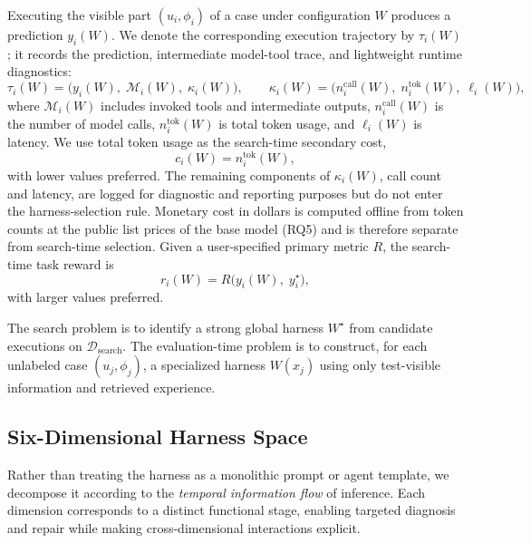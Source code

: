 \documentclass{article}
\begin{document}
\noindent
Executing the visible part $(u_i,\phi_i)$ of a case under configuration $W$
produces a prediction $y_i(W)$. We denote the corresponding execution
trajectory by $\tau_i(W)$; it records the prediction, intermediate
model-tool trace, and lightweight runtime diagnostics:
\begin{equation}
\label{eq:trajectory}
\tau_i(W)
=
\bigl(
  y_i(W),\;
  \mathcal{M}_i(W),\;
  \kappa_i(W)
\bigr),
\qquad
\kappa_i(W)
=
\bigl(n_i^{\mathrm{call}}(W),\;
n_i^{\mathrm{tok}}(W),\;
\ell_i(W)\bigr),
\end{equation}
where $\mathcal{M}_i(W)$ includes invoked tools and intermediate outputs,
$n_i^{\mathrm{call}}(W)$ is the number of model calls,
$n_i^{\mathrm{tok}}(W)$ is total token usage, and $\ell_i(W)$ is latency.
We use total token usage as the search-time secondary cost,
\begin{equation}
\label{eq:cost}
c_i(W) = n_i^{\mathrm{tok}}(W),
\end{equation}
with lower values preferred. The remaining components of $\kappa_i(W)$,
call count and latency, are logged for diagnostic and reporting
purposes but do not enter the harness-selection rule. Monetary cost in
dollars is computed offline from token counts at the public list prices
of the base model (RQ5) and is therefore
separate from search-time selection. Given a user-specified primary
metric $R$, the search-time task reward is
\begin{equation}
\label{eq:reward}
r_i(W) = R \!\bigl(y_i(W),\; y_i^\star\bigr),
\end{equation}
with larger values preferred.

\noindent
The search problem is to identify a strong global harness $W^\star$ from
candidate executions on $\mathcal{D}_{\mathrm{search}}$. The evaluation-time
problem is to construct, for each unlabeled case $(u_j,\phi_j)$, a specialized
harness $W(x_j)$ using only test-visible information and retrieved experience.

\subsection{Six-Dimensional Harness Space}
\label{sec:harness_space}

\begin{insightbox}[title={Design rationale}]
Rather than treating the harness as a monolithic prompt or agent template, we
decompose it according to the \emph{temporal information flow} of inference.
Each dimension corresponds to a distinct functional stage, enabling targeted
diagnosis and repair while making cross-dimensional interactions explicit.
\end{insightbox}
\end{document}
